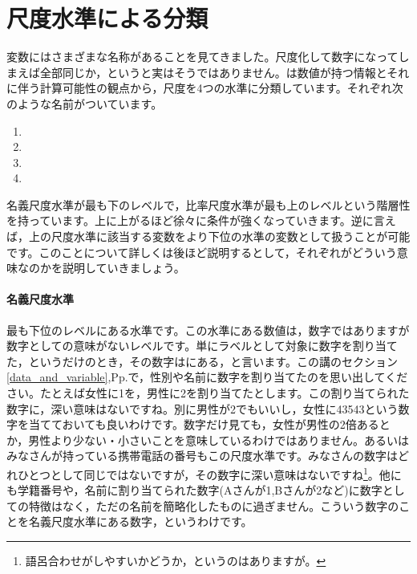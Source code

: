 \documentclass{ltjsbook}
\begin{document}
\section{尺度水準による分類}
変数にはさまざまな名称があることを見てきました。尺度化して数字になってしまえば全部同じか，というと実はそうではありません。\textcite{stevens1946}は数値が持つ情報とそれに伴う計算可能性の観点から，尺度を4つの水準に分類しています。それぞれ次のような名前がついています。
\begin{enumerate}
	\item {}
	\item {}
	\item {}
	\item {}
\end{enumerate}

名義尺度水準が最も下のレベルで，比率尺度水準が最も上のレベルという階層性を持っています。上に上がるほど徐々に条件が強くなっていきます。逆に言えば，上の尺度水準に該当する変数をより下位の水準の変数として扱うことが可能です。このことについて詳しくは後ほど説明するとして，それぞれがどういう意味なのかを説明していきましょう。

\paragraph{名義尺度水準}
最も下位のレベルにある水準です。この水準にある数値は，数字ではありますが数字としての意味がないレベルです。単にラベルとして対象に数字を割り当てた，というだけのとき，その数字はにある，と言います。この講のセクション\ref{data_and_variable},Pp.\pageref{data_and_variable}で，性別や名前に数字を割り当てたのを思い出してください。たとえば女性に1を，男性に2を割り当てたとします。この割り当てられた数字に，深い意味はないですね。別に男性が2でもいいし，女性に43543という数字を当てておいても良いわけです。数字だけ見ても，女性が男性の2倍あるとか，男性より少ない・小さいことを意味しているわけではありません。あるいはみなさんが持っている携帯電話の番号もこの尺度水準です。みなさんの数字はどれひとつとして同じではないですが，その数字に深い意味はないですね\footnote{語呂合わせがしやすいかどうか，というのはありますが。}。他にも学籍番号や，名前に割り当てられた数字(Aさんが1,Bさんが2など)に数字としての特徴はなく，ただの名前を簡略化したものに過ぎません。こういう数字のことを名義尺度水準にある数字，というわけです。
\end{document}
